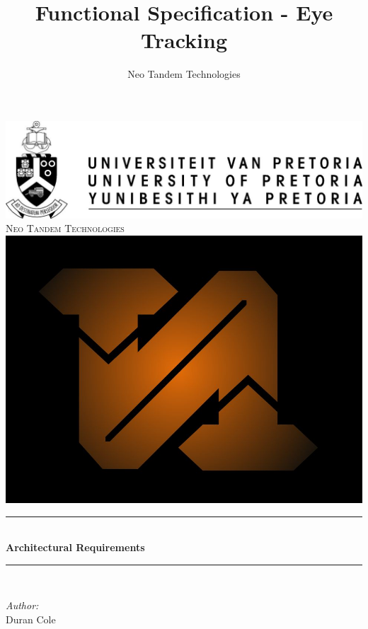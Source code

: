 \documentclass[a4paper,12pt]{report}
\author{Neo Tandem Technologies}
\title{ Functional Specification - Eye Tracking}
\newcommand{\HRule}{\rule{\linewidth}{0.5mm}}
\begin{document}
\setlength{\parskip}{6pt}

\begin{titlepage}

\begin{center}
\includegraphics[scale=1]{../GeneralImages/up-logo.jpg}
\\[1cm]    
    

\textsc{\LARGE Neo Tandem Technologies}\\[1.5cm]
\includegraphics[scale=0.2]{../GeneralImages/NTT.jpg}\\[1.5cm]
\HRule \\[0.4cm]
{ \huge \bfseries Architectural Requirements}\\[0.4cm]
\HRule \\[0.4cm]
\begin{minipage}{0.4\textwidth}
\begin{flushleft} \large
\emph{Author:}\\
Duran {Cole}
\end{flushleft}

\end{minipage}
\end{center}
\end{titlepage}
\end{document}
